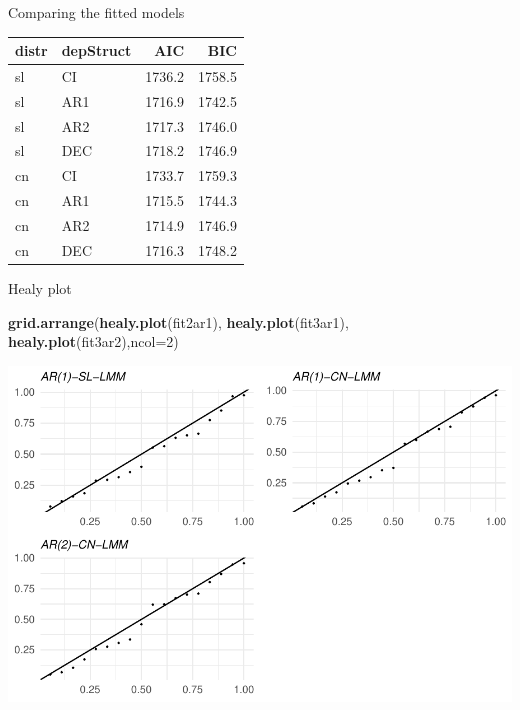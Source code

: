 \documentclass[
  ignorenonframetext,
]{beamer}
\newenvironment{Shaded}{\begin{snugshade}}{\end{snugshade}}
\newcommand{\DataTypeTok}[1]{\textcolor[rgb]{0.13,0.29,0.53}{#1}}
\newcommand{\DecValTok}[1]{\textcolor[rgb]{0.00,0.00,0.81}{#1}}
\newcommand{\KeywordTok}[1]{\textcolor[rgb]{0.13,0.29,0.53}{\textbf{#1}}}
\newcommand{\NormalTok}[1]{#1}
\begin{document}
\begin{frame}{Comparing the fitted models}
\protect\hypertarget{comparing-the-fitted-models-1}{}

\begin{longtable}[]{@{}llrr@{}}
\toprule
distr & depStruct & AIC & BIC\tabularnewline
\midrule
\endhead
sl & CI & 1736.2 & 1758.5\tabularnewline
sl & AR1 & 1716.9 & 1742.5\tabularnewline
sl & AR2 & 1717.3 & 1746.0\tabularnewline
sl & DEC & 1718.2 & 1746.9\tabularnewline
cn & CI & 1733.7 & 1759.3\tabularnewline
cn & AR1 & 1715.5 & 1744.3\tabularnewline
cn & AR2 & 1714.9 & 1746.9\tabularnewline
cn & DEC & 1716.3 & 1748.2\tabularnewline
\bottomrule
\end{longtable}

\end{frame}

\begin{frame}[fragile]{Healy plot}
\protect\hypertarget{healy-plot-1}{}

\small

\begin{Shaded}
\begin{Highlighting}[]
\KeywordTok{grid.arrange}\NormalTok{(}\KeywordTok{healy.plot}\NormalTok{(fit2ar1),}
            \KeywordTok{healy.plot}\NormalTok{(fit3ar1),}
            \KeywordTok{healy.plot}\NormalTok{(fit3ar2),}\DataTypeTok{ncol=}\DecValTok{2}\NormalTok{)}
\end{Highlighting}
\end{Shaded}

\begin{center}\includegraphics[width=0.85\linewidth]{codes_files/figure-beamer/healy2-1} \end{center}

\end{frame}
\end{document}

